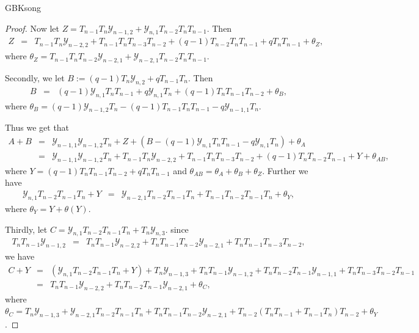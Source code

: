 \documentclass[13pt,a4paper, oneside]{amsart}       %
\numberwithin{equation}{section}
\theoremstyle{definition}
\theoremstyle{remark}
\begin{document}
\begin{CJK*}{GBK}{song}
\begin{proof}
Now let $Z=\!T_{n\!-\!1}T_n\mathscr{Y}_{n\!-\!1,2}\!+\!
\mathscr{Y}_{n,1}T_{n\!-\!2}T_nT_{n\!-\!1}$. Then
\begin{eqnarray*}
 Z&=&\!
T_{n\!-\!1}T_n\mathscr{Y}_{n-2,2}+
T_{n-1}T_nT_{n-3}T_{n-2}+(q-1)T_{n-2}T_nT_{n-1}+q
T_nT_{n-1}+\theta_Z,
\end{eqnarray*}
where $\theta_Z=T_{n-1}T_nT_{n-2}\mathscr{Y}_{n-2,1}+
\mathscr{Y}_{n-2,1}T_{n-2}T_nT_{n-1}$.

Secondly, we let $B:=(q\!-\!1)T_n\mathscr{Y}_{n,2}\!+\!qT_{n\!-\!1}T_n$. Then
\begin{eqnarray*}
B&=&(q-1)\mathscr{Y}_{n,1}T_nT_{n-1}+q\mathscr{Y}_{n,1}T_n+
(q-1)T_nT_{n-1}T_{n-2}+\theta_B,\end{eqnarray*}
where $\theta_B=(q\!-\!1)\mathscr{Y}_{n\!-\!1,2}T_n\!-\!
(q\!-\!1)T_{n\!-\!1}T_nT_{n\!-\!1}-q\mathscr{Y}_{n\!-\!1,1}T_n$.

Thus we get that
\begin{eqnarray*}
A+B&=&\mathscr{Y}_{n-1,1}\mathscr{Y}_{n-1,2}T_n+Z+
(B-(q-1)\mathscr{Y}_{n,1}T_nT_{n-1}-q\mathscr{Y}_{n,1}T_n)+\theta_A\\
&=&\mathscr{Y}_{n-1,1}\mathscr{Y}_{n-1,2}T_n+
T_{n-1}T_n\mathscr{Y}_{n-2,2}+T_{n-1}T_nT_{n-3}
T_{n-2}+(q-1)T_nT_{n-2}T_{n-1}+Y+\theta_{AB},
\end{eqnarray*}
where $Y=(q-1)T_nT_{n-1}T_{n-2}
+qT_nT_{n-1}$ and $\theta_{AB}=\theta_A+\theta_B+\theta_Z$. Further we have \begin{eqnarray*}
\mathscr{Y}_{n,1}T_{n-2}T_{n-1}T_n+Y&=&
\mathscr{Y}_{n-2,1}T_{n\!-\!2}T_{n\!-\!1}T_n+
T_{n-1}T_{n-2}T_{n-1}T_n+\theta_{Y},
\end{eqnarray*}
where $\theta_Y=Y+\theta(Y)$.

Thirdly, let
$C=\mathscr{Y}_{n,1}T_{n-2}T_{n-1}T_n+ T_n\mathscr{Y}_{n,3}$.
since \begin{eqnarray*}
 T_nT_{n\!-\!1}\mathscr{Y}_{n\!-\!1,2}\!&=&\!
T_nT_{n\!-\!1}\mathscr{Y}_{n\!-\!2,2}\!+\!
 T_nT_{n\!-\!1}T_{n\!-\!2}\mathscr{Y}_{n-2,1}\!+\!
T_nT_{n\!-\!1}T_{n\!-\!3}T_{n\!-\!2},
\end{eqnarray*}
we have
\begin{eqnarray*}
C+Y&=&(\mathscr{Y}_{n,1}T_{n\!-\!2}T_{n\!-\!1}T_n\!+Y)+\!T_n\mathscr{Y}_{n-1,3}+
 T_nT_{n-1}\mathscr{Y}_{n-1,2}+T_nT_{n-2}T_{n-1}\mathscr{Y}_{n-1,1}
 +T_nT_{n-3}T_{n-2}T_{n-1}\\
\!\!&=&\!\!T_nT_{n\!-\!1}\mathscr{Y}_{n\!-\!2,2}\!+
\!T_nT_{n\!-\!2}T_{n\!-\!1}
\mathscr{Y}_{n\!-\!2,1}\!+\!\theta_{C},
 \end{eqnarray*}
where $\theta_C=T_n\mathscr{Y}_{n\!-\!1,3}\!+\!\mathscr{Y}_{n-2,1}
T_{n\!-\!2}T_{n\!-\!1}T_n\!+
T_nT_{n\!-\!1}T_{n\!-\!2}\mathscr{Y}_{n-2,1}+
T_{n-2}(T_nT_{n-1}+T_{n-1}T_n)T_{n-2}+\theta_{Y}$.


\end{proof}
\end{CJK*}
\end{document}
